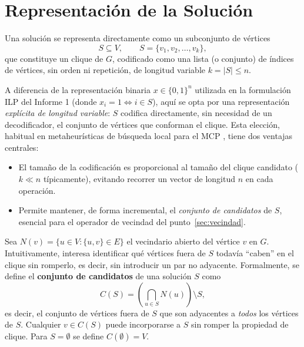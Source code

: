 \documentclass[letterpaper,12pt]{article}
\begin{document}
\section{Representación de la Solución}\label{sec:representacion}

Una solución se representa directamente como un subconjunto de vértices
\[
S \subseteq V, \qquad S = \{v_1, v_2, \ldots, v_k\},
\]
que constituye un clique de $G$, codificado como una lista (o conjunto) de índices de vértices, sin orden ni repetición, de longitud variable $k = |S| \leq n$.

A diferencia de la representación binaria $x \in \{0,1\}^n$ utilizada en la formulación ILP del Informe 1 (donde $x_i = 1 \Leftrightarrow i \in S$), aquí se opta por una representación \emph{explícita de longitud variable}: $S$ codifica directamente, sin necesidad de un decodificador, el conjunto de vértices que conforman el clique. Esta elección, habitual en metaheurísticas de búsqueda local para el MCP \parencite{battiti2001reactive, pullan2006dynamic, katayama2005effective}, tiene dos ventajas centrales:

\begin{itemize}
    \item El tamaño de la codificación es proporcional al tamaño del clique candidato ($k \ll n$ típicamente), evitando recorrer un vector de longitud $n$ en cada operación.
    \item Permite mantener, de forma incremental, el \emph{conjunto de candidatos} de $S$, esencial para el operador de vecindad del punto~\ref{sec:vecindad}.
\end{itemize}

Sea $N(v) = \{u \in V : \{u,v\} \in E\}$ el vecindario abierto del vértice $v$ en $G$. Intuitivamente, interesa identificar qué vértices fuera de $S$ todavía ``caben'' en el clique sin romperlo, es decir, sin introducir un par no adyacente. Formalmente, se define el \textbf{conjunto de candidatos} de una solución $S$ como
\begin{equation}\label{eq:candidatos}
    C(S) = \left( \bigcap_{u \in S} N(u) \right) \setminus S,
\end{equation}
es decir, el conjunto de vértices fuera de $S$ que son adyacentes a \emph{todos} los vértices de $S$. Cualquier $v \in C(S)$ puede incorporarse a $S$ sin romper la propiedad de clique. Para $S = \emptyset$ se define $C(\emptyset) = V$.

\end{document}
